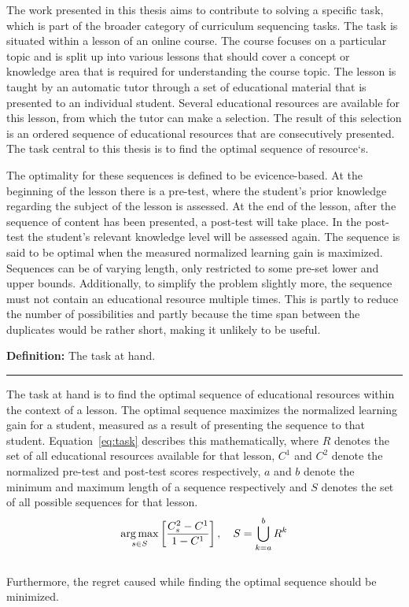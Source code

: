 
The work presented in this thesis aims to contribute to solving a specific
task, which is part of the broader category of curriculum sequencing tasks.
The task is situated within a lesson of an online course. The course
focuses on a particular topic and is split up into various lessons that should
cover a concept or knowledge area that is required for understanding the
course topic. The lesson is taught by an automatic tutor through a set of
educational material that is presented to an individual student. Several
educational resources are available for this lesson, from which the tutor can
make a selection. The result of this selection is an ordered sequence of
educational resources that are consecutively presented. The task central
to this thesis is to find the optimal sequence of resource`s.

The optimality for these sequences is defined to be evicence-based. At the
beginning of the lesson there is a pre-test, where the student's prior knowledge
regarding the subject of the lesson is assessed. At the end of the lesson,
after the sequence of content has been presented, a post-test will take place.
In the post-test the student's relevant knowledge level will be assessed again.
The sequence is said to be optimal when the measured normalized learning gain
is maximized. Sequences can be of varying length, only restricted to some pre-set
lower and upper bounds. Additionally, to simplify the problem slightly more,
the sequence must not contain an educational resource multiple times. This is
partly to reduce the number of possibilities and partly because the time span
between the duplicates would be rather short, making it unlikely to be useful.

\begin{framed}\noindent
\textbf{{\large Definition:}} The task at hand. \vspace{0.5\onelineskip} \hrule
\vspace{\baselineskip}\noindent
The task at hand is to find the optimal sequence of educational resources
within the context of a lesson. The optimal sequence maximizes the normalized
learning gain for a student, measured as a result of presenting the sequence to
that student. Equation~\eqref{eq:task} describes this mathematically, where $R$
denotes the set of all educational resources available for that lesson, $C^1$
and $C^2$ denote the normalized pre-test and post-test scores respectively, $a$
and $b$ denote the minimum and maximum length of a sequence respectively and
$S$ denotes the set of all possible sequences for that lesson.\noindent
\begin{equation}
	\label{eq:task}
	\operatorname*{arg\,max}_{s \in S} \left[ \frac{C^2_s-C^1}{1-C^1} \right],
	\quad S = \bigcup_{k = a}^{b} R^k
\end{equation}\\
\noindent
Furthermore, the regret caused while finding the optimal sequence
should be minimized.
\end{framed}

